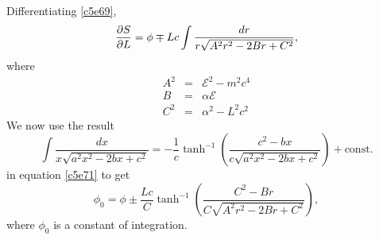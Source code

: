 \begin{enumerate}
Differentiating \eqref{c5e69},
\begin{equation}\label{c5e71}
\frac{\partial{S}}{\partial{L}} = \phi \mp Lc\int\frac{dr}{r\sqrt{A^2r^2 - 2Br + C^2}},
\end{equation}
where
\begin{eqnarray}
A^2 &=& \mathcal{E}^2 - m^2c^4 \label{c5e72} \\
B   &=& \alpha\mathcal{E} \label{c5e73} \\
C^2 &=& \alpha^2 - L^2c^2 \label{c5e74}
\end{eqnarray}
We now use the result
\begin{equation}\label{c5e75}
\int\frac{dx}{x\sqrt{a^2x^2 - 2bx + c^2}} = 
-\frac{1}{c}\tanh^{-1}\left(\frac{c^2 - bx}{c\sqrt{a^2x^2 - 2bx + c^2}}\right) +
\text{const}.
\end{equation}
in equation \eqref{c5e71} to get
\begin{equation}\label{c5e76}
\phi_0 = \phi \pm \frac{Lc}{C}\tanh^{-1}\left(\frac{C^2 - Br}{C\sqrt{A^2r^2 - 2Br + C^2}}\right),
\end{equation}
where $\phi_0$ is a constant of integration.


\end{enumerate}
